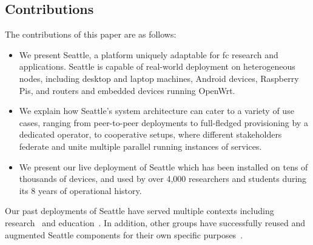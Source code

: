 \subsection{Contributions}

The contributions of this paper are as follows:
\begin{itemize}
\item We present Seattle, a platform uniquely adaptable for
 \gls{fc} research and applications. Seattle is
capable of real-world deployment on heterogeneous nodes,
including desktop and laptop machines, Android devices,
Raspberry Pis,
and routers and embedded devices running OpenWrt.
\item We explain how
Seattle's system architecture can cater to a variety of use cases,
ranging from peer-to-peer deployments to full-fledged
provisioning by a dedicated operator, to cooperative setups,
where different stakeholders federate and unite multiple parallel running
instances of services.
\item We present our live deployment of Seattle which has been
installed on tens of thousands of devices, and used by over 4,000
researchers and students during its 8 years of operational history.
\end{itemize}
Our past deployments of Seattle have served multiple contexts
including research~\cite{li2015fence,rafetseder2013sensorium,zhuang2014sensibility,Eisl1010:Service,Tuts1010:Sustained,collares2011smart,zhuang2015privacy,cappos2014blursense,7133607} and education~\cite{Wallace_CCSC_2011,Cappos_CCSCCP_2010,Cappos_CCSCNW_2009,Cappos_SIGCSE_2014,Hooshangi_SIGCSE_2015}.
In addition, other groups have successfully reused and augmented Seattle components
for their own specific purposes~\cite{chard2010social,chard12ssc,caton2014social,muller2014tomato,tomato,eittenberger2012doubtless,zhuang2012distributed,zhuang2014taking,tredger2013building}.
